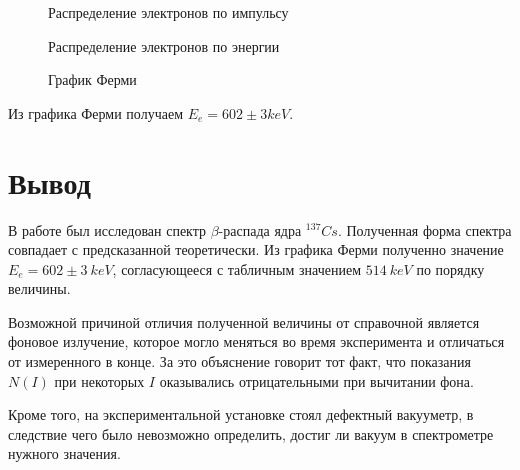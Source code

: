 \documentclass[12pt,a4paper]{article}
\begin{document}
\begin{figure}[ht!]
\caption{Распределение электронов по импульсу}
\end{figure}

\begin{figure}[ht!] 
\caption{Распределение электронов по энергии}
\end{figure}

\begin{figure}[ht!] \label{fermi}
\caption{График Ферми}
\end{figure}
\newpage
Из графика Ферми получаем $E_e = 602 \pm 3 keV$.

\section{Вывод}

В работе был исследован спектр $\beta$-распада ядра ${}^{137}Cs$. Полученная форма спектра совпадает с предсказанной теоретически. Из графика Ферми полученно значение $E_e = 602 \pm 3 \ keV$, согласующееся с табличным значением $514 \ keV$ по порядку величины. 

Возможной причиной отличия полученной величины от справочной является фоновое излучение, которое могло меняться во время эксперимента и отличаться от измеренного в конце. За это объяснение говорит тот факт, что показания $N(I)$ при некоторых $I$ оказывались отрицательными при вычитании фона. 

Кроме того, на экспериментальной установке стоял дефектный вакууметр, в следствие чего было невозможно определить, достиг ли вакуум в спектрометре нужного значения.
\end{document}
